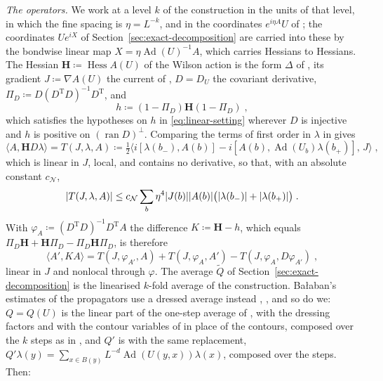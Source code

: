 \documentclass[11pt]{preprint}
\DeclarePairedDelimiter{\abs}{\lvert}{\rvert}
\numberwithin{equation}{section}
\theoremstyle{definition}
\theoremstyle{remark}
\theoremstyle{plain}
\begin{document}
\emph{The operators.} We work at a level $k$ of the construction in the units of that level, in which the fine spacing is $\eta = L^{-k}$, and in the coordinates $e^{i\eta A}U$ of \cite{BalabanPBG}; the coordinates $Ue^{iX}$ of Section~\ref{sec:exact-decomposition} are carried into these by the bondwise linear map $X = \eta\operatorname{Ad}(U)^{-1}A$, which carries Hessians to Hessians. The Hessian $\mathbf H \coloneqq \operatorname{Hess}A(U)$ of the Wilson action is the form $\Delta$ of \cite[(3.10), p.~392]{BalabanPBG}, its gradient $J \coloneqq \nabla A(U)$ the current of \cite[(3.11)]{BalabanPBG}, $D = D_U$ the covariant derivative, $\Pi_D \coloneqq D(D^{\mathrm T}D)^{-1}D^{\mathrm T}$, and
\begin{equation}\label{eq:gauge-invariant-hessian}
    h \coloneqq (1 - \Pi_D)\mathbf H(1 - \Pi_D)\;,
\end{equation}
which satisfies the hypotheses on $h$ in \eqref{eq:linear-setting} wherever $D$ is injective and $h$ is positive on $(\operatorname{ran}D)^\perp$. Comparing the terms of first order in $\lambda$ in \cite[(3.117), p.~419]{BalabanPBG} gives
\begin{equation}\label{eq:hessian-defect}
    \langle A, \mathbf HD\lambda \rangle = T(J, \lambda, A) \coloneqq \tfrac12\bigl\langle i[\lambda(b_-), A(b)] - i[A(b), \operatorname{Ad}(U_b)\lambda(b_+)],\, J \bigr\rangle\;,
\end{equation}
which is linear in $J$, local, and contains no derivative, so that, with an absolute constant $c_{\mathcal N}$,
\[
    \abs{T(J, \lambda, A)} \leq c_{\mathcal N}\sum_b\eta^4\abs{J(b)}\abs{A(b)}\bigl(\abs{\lambda(b_-)} + \abs{\lambda(b_+)}\bigr)\;.
\]
With $\varphi_A \coloneqq (D^{\mathrm T}D)^{-1}D^{\mathrm T}A$ the difference $K \coloneqq \mathbf H - h$, which equals $\Pi_D\mathbf H + \mathbf H\Pi_D - \Pi_D\mathbf H\Pi_D$, is therefore
\begin{equation}\label{eq:hessian-difference}
    \langle A', KA \rangle = T(J, \varphi_{A'}, A) + T(J, \varphi_A, A') - T(J, \varphi_A, D\varphi_{A'})\;,
\end{equation}
linear in $J$ and nonlocal through $\varphi$. The average $\tilde Q$ of Section~\ref{sec:exact-decomposition} is the linearised $k$-fold average of the construction. Ba{\l}aban's estimates of the propagators use a dressed average instead \cite[p.~392]{BalabanPBG}, \cite[(89)--(92), p.~31]{BalabanAVG}, and so do we: $Q = Q(U)$ is the linear part of the one-step average of \cite[p.~418]{BalabanPBG}, with the dressing factors \cite[(3.113)]{BalabanPBG} and with the contour variables of \cite[(0.11), p.~253]{BalabanRG1} in place of the contours, composed over the $k$ steps as in \cite[(3.15), p.~393]{BalabanPBG}, and $Q'$ is \cite[(3.19)]{BalabanPBG} with the same replacement, $Q'\lambda(y) = \sum_{x \in B(y)}L^{-d}\operatorname{Ad}(U(y, x))\lambda(x)$, composed over the steps. Then:
\end{document}
